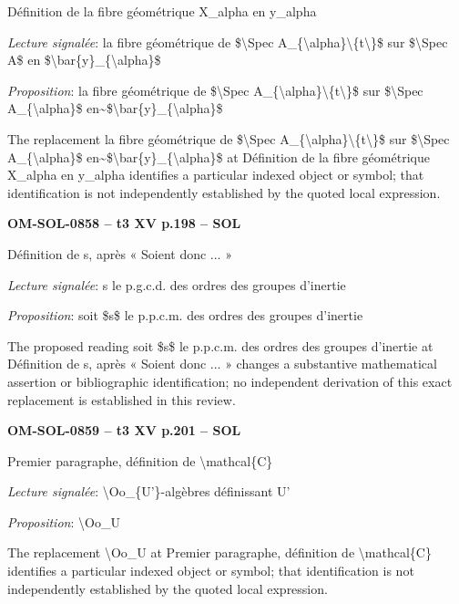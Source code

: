 Définition de la fibre géométrique X\_alpha en y\_alpha\par
\emph{Lecture signalée}: la fibre géométrique de \$\textbackslash{}Spec A\_\{\textbackslash{}alpha\}\textbackslash{}\{t\textbackslash{}\}\$ sur \$\textbackslash{}Spec A\$ en \$\textbackslash{}bar\{y\}\_\{\textbackslash{}alpha\}\$\par
\emph{Proposition}: la fibre géométrique de \$\textbackslash{}Spec A\_\{\textbackslash{}alpha\}\textbackslash{}\{t\textbackslash{}\}\$ sur \$\textbackslash{}Spec A\_\{\textbackslash{}alpha\}\$ en\textasciitilde{}\$\textbackslash{}bar\{y\}\_\{\textbackslash{}alpha\}\$\par
The replacement la fibre géométrique de \$\textbackslash{}Spec A\_\{\textbackslash{}alpha\}\textbackslash{}\{t\textbackslash{}\}\$ sur \$\textbackslash{}Spec A\_\{\textbackslash{}alpha\}\$ en\textasciitilde{}\$\textbackslash{}bar\{y\}\_\{\textbackslash{}alpha\}\$ at Définition de la fibre géométrique X\_alpha en y\_alpha identifies a particular indexed object or symbol; that identification is not independently established by the quoted local expression.\par
\par\noindent\textbf{OM-SOL-0858 -- t3 XV p.198 -- SOL}\par
Définition de s, après « Soient donc ... »\par
\emph{Lecture signalée}: s le p.g.c.d. des ordres des groupes d'inertie\par
\emph{Proposition}: soit \$s\$ le p.p.c.m. des ordres des groupes d'inertie\par
The proposed reading soit \$s\$ le p.p.c.m. des ordres des groupes d'inertie at Définition de s, après « Soient donc ... » changes a substantive mathematical assertion or bibliographic identification; no independent derivation of this exact replacement is established in this review.\par
\par\noindent\textbf{OM-SOL-0859 -- t3 XV p.201 -- SOL}\par
Premier paragraphe, définition de \textbackslash{}mathcal\{C\}\par
\emph{Lecture signalée}: \textbackslash{}Oo\_\{U'\}-algèbres définissant U'\par
\emph{Proposition}: \textbackslash{}Oo\_U\par
The replacement \textbackslash{}Oo\_U at Premier paragraphe, définition de \textbackslash{}mathcal\{C\} identifies a particular indexed object or symbol; that identification is not independently established by the quoted local expression.\par
